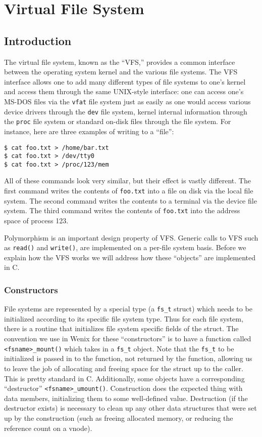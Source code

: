 \chapter{Virtual File System}
\label{vfs}


\section{Introduction}

The virtual file system, known as the ``VFS,'' provides a common interface between the operating system kernel and the various file systems. The VFS interface allows one to add many different types of file systems to one's kernel and access them through the same UNIX-style interface: one can access one's MS-DOS files via the \texttt{vfat} file system just as easily as one would access various device drivers through the \texttt{dev} file system, kernel internal information through the \texttt{proc} file system or standard on-disk files through the  file system. For instance, here are three examples of writing to a ``file'':
\begin{verbatim}
$ cat foo.txt > /home/bar.txt
$ cat foo.txt > /dev/tty0
$ cat foo.txt > /proc/123/mem\end{verbatim}
All of these commands look very similar, but their effect is vastly different. The first command writes the contents of \texttt{foo.txt} into a file on disk via the local file system. The second command writes the contents to a terminal via the device file system. The third command writes the contents of \texttt{foo.txt} into the address space of process 123.

Polymorphism is an important design property of VFS.  Generic calls to VFS such as \texttt{read()} and \texttt{write()}, are implemented on a per-file system basis.  Before we explain how the VFS works we will address how these ``objects'' are implemented in C.

\subsection{Constructors}

File systems are represented by a special type (a \texttt{fs\_t} struct) which needs to be initialized according to its specific file system type. Thus for each file system, there is a routine that initializes file system specific fields of the struct. The convention we use in Wenix for these ``constructors'' is to have a function called \texttt{<fsname>\_mount()} which takes in a \texttt{fs\_t} object. Note that the \texttt{fs\_t} to be initialized is passed in to the function, not returned by the function, allowing us to leave the job of allocating and freeing space for the struct up to the caller. This is pretty standard in C. Additionally, some objects have a corresponding ``destructor'' \texttt{<fsname>\_umount()}. Construction does the expected thing with data members, initializing them to some well-defined value. Destruction (if the destructor exists) is necessary to clean up any other data structures that were set up by the construction (such as freeing allocated memory, or reducing the reference count on a vnode).

